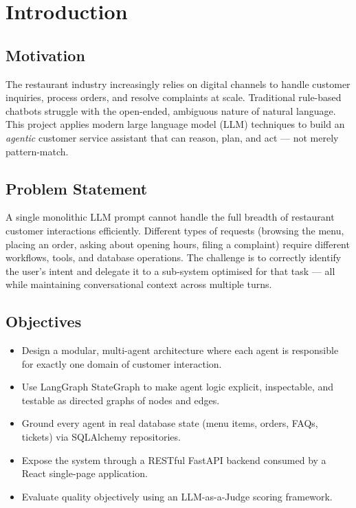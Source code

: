 \documentclass[12pt,a4paper]{report}
\begin{document}
\tableofcontents
\listoffigures
\listoftables
\newpage

\chapter{Introduction}

\section{Motivation}

The restaurant industry increasingly relies on digital channels to handle customer
inquiries, process orders, and resolve complaints at scale. Traditional rule-based
chatbots struggle with the open-ended, ambiguous nature of natural language.
This project applies modern large language model (LLM) techniques to build an
\textit{agentic} customer service assistant that can reason, plan, and act — not
merely pattern-match.

\section{Problem Statement}

A single monolithic LLM prompt cannot handle the full breadth of restaurant customer
interactions efficiently. Different types of requests (browsing the menu, placing an
order, asking about opening hours, filing a complaint) require different workflows,
tools, and database operations. The challenge is to correctly identify the user's
intent and delegate it to a sub-system optimised for that task — all while maintaining
conversational context across multiple turns.

\section{Objectives}

\begin{itemize}[leftmargin=1.5cm]
    \item Design a modular, multi-agent architecture where each agent is responsible
          for exactly one domain of customer interaction.
    \item Use LangGraph StateGraph to make agent logic explicit, inspectable, and
          testable as directed graphs of nodes and edges.
    \item Ground every agent in real database state (menu items, orders, FAQs, tickets)
          via SQLAlchemy repositories.
    \item Expose the system through a RESTful FastAPI backend consumed by a React
          single-page application.
    \item Evaluate quality objectively using an LLM-as-a-Judge scoring framework.
\end{itemize}
\end{document}
